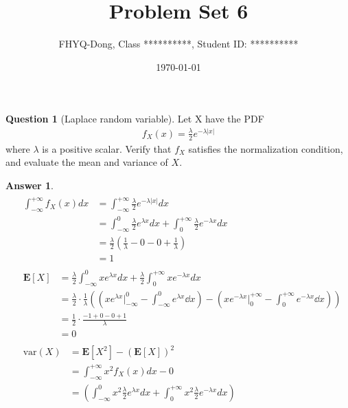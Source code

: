 \documentclass[utf8]{article}
\title{Problem Set 6}
\author{ FHYQ-Dong, Class **********, Student ID: ********** }
\date{\today}
\theoremstyle{definition}%
\newtheorem{question}{Question} %
\theoremstyle{plain}%
\newtheorem{answer}{Answer} %
\begin{document}
\maketitle
\thispagestyle{fancy}

\begin{question}[Laplace random variable]
    Let X have the PDF
    \begin{align}
        f_{X}(x) = \frac{\lambda}{2}e^{-\lambda|x|}
    \end{align}
    where $\lambda$ is a positive scalar. Verify that $f_X$ satisfies the normalization condition, and evaluate the mean and variance of $X$.
\end{question}
\begin{answer}
    \begin{align}
    &\begin{aligned}
        \int_{-\infty}^{+\infty}f_{X}(x)dx &= \int_{-\infty}^{+\infty}\frac{\lambda}{2}e^{-\lambda|x|}dx \\
        &= \int_{-\infty}^{0}\frac{\lambda}{2}e^{\lambda x}dx + \int_{0}^{+\infty}\frac{\lambda}{2}e^{-\lambda x}dx \\
        &= \frac{\lambda}{2}\left(\frac{1}{\lambda} - 0 - 0 + \frac{1}{\lambda}\right) \\
        &= 1
    \end{aligned} \\ 
    &\begin{aligned}
        \mathbf{E}[X] &= \frac{\lambda}{2}\int_{-\infty}^{0}xe^{\lambda x}dx + \frac{\lambda}{2}\int_{0}^{+\infty}xe^{-\lambda x}dx \\
        &= \frac{\lambda}{2}\cdot\frac{1}{\lambda}\left(\left(xe^{\lambda x}\Big|_{-\infty}^{0} - \int_{-\infty}^{0}e^{\lambda x}\dd{x}\right) - \left(xe^{-\lambda x}\Big|_{0}^{+\infty} - \int_{0}^{+\infty}e^{-\lambda x}\dd{x}\right)\right) \\ 
        &= \frac{1}{2} \cdot \frac{-1 + 0 - 0 + 1}{\lambda} \\
        &= 0
    \end{aligned} \\ 
    &\begin{aligned}
        \text{var}(X) &= \mathbf{E}[X^2] - (\mathbf{E}[X])^2 \\
        &= \int_{-\infty}^{+\infty}x^2f_{X}(x)dx - 0 \\ 
        &= \left(\int_{-\infty}^{0}x^2\frac{\lambda}{2}e^{\lambda x}dx + \int_{0}^{+\infty}x^2\frac{\lambda}{2}e^{-\lambda x}dx\right) \\

\end{aligned}
\end{align}
\end{answer}
\end{document}
